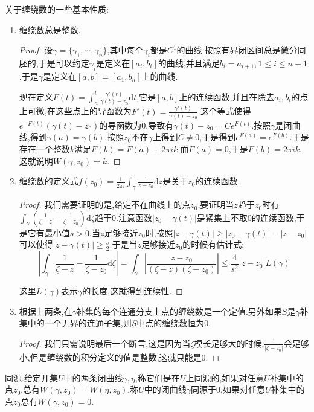 关于缠绕数的一些基本性质:
\begin{enumerate}
	\item 缠绕数总是整数.
	\begin{proof}
		
		设$\gamma=\{\gamma_1,\cdots,\gamma_n\}$,其中每个$\gamma_i$都是$C^1$的曲线.按照有界闭区间总是微分同胚的,于是可以约定$\gamma_i$是定义在$[a_i,b_i]$的曲线,并且满足$b_i=a_{i+1},1\le i\le n-1$.于是$\gamma$是定义在$[a,b]=[a_1,b_n]$上的曲线.
		
		现在定义$F(t)=\int_a^t\frac{\gamma'(t)}{\gamma(t)-z_0}\mathrm{d}t$,它是$[a,b]$上的连续函数,并且在除去$a_i,b_i$的点上可微,在这些点上的导函数为$F'(t)=\frac{\gamma'(t)}{\gamma(t)-z_0}$.这个等式使得$e^{-F(t)}(\gamma(t)-z_0)$的导函数为0,导致有$\gamma(t)-z_0=Ce^{F(t)}$.按照$\gamma$是闭曲线,得到$\gamma(a)=\gamma(b)$.按照$z_0$不在$\gamma$上得到$C\not=0$,于是得到$e^{F(a)}=e^{F(b)}$.于是存在一个整数$k$满足$F(b)=F(a)+2\pi ik$.而$F(a)=0$,于是$F(b)=2\pi ik$.这就说明$W(\gamma,z_0)=k$.
	\end{proof}
	\item 缠绕数的定义式$f(z_0)=\frac{1}{2\pi i}\int_{\gamma}\frac{1}{z-z_0}\mathrm{d}z$是关于$z_0$的连续函数.
	\begin{proof}
		
		我们需要证明的是,给定不在曲线上的点$z_0$,要证明当$z$趋于$z_0$时有$\int_{\gamma}\left(\frac{1}{\zeta-z}-\frac{1}{\zeta-z_0}\right)\mathrm{d}\zeta$趋于0.注意函数$|z_0-\gamma(t)|$是紧集上不取0的连续函数,于是它有最小值$s>0$.当$z$足够接近$z_0$时,按照$|z-\gamma(t)|\ge|z_0-\gamma(t)|-|z-z_0|$可以使得$|z-\gamma(t)|\ge\frac{s}{2}$.于是当$z$足够接近$z_0$的时候有估计式:
		$$\left|\int_{\gamma}\frac{1}{\zeta-z}-\frac{1}{\zeta-z_0}\mathrm{d}\zeta\right|=\int_{\gamma}\left|\frac{z-z_0}{(\zeta-z)(\zeta-z_0)}\right|\le\frac{4}{s^2}|z-z_0|L(\gamma)$$
		
		这里$L(\gamma)$表示$\gamma$的长度,这就得到连续性.
	\end{proof}
	\item 根据上两条,在$\gamma$补集的每个连通分支上点的缠绕数是一个定值.另外如果$S$是$\gamma$补集中的一个无界的连通子集,则$S$中点的缠绕数恒为0.
	\begin{proof}
		
		我们只需说明最后一个断言,这是因为当$\zeta$模长足够大的时候,$\frac{1}{|\zeta-z_0|}$会足够小,但是缠绕数的积分定义的值是整数,这就只能是0.
	\end{proof}
\end{enumerate}

同源.给定开集$U$中的两条闭曲线$\gamma,\eta$,称它们是在$U$上同源的,如果对任意$U$补集中的点$z_0$,总有$W(\gamma,z_0)=W(\eta,z_0)$.称$U$中的闭曲线$\gamma$同源于0,如果对任意$U$补集中的点$z_0$总有$W(\gamma,z_0)=0$.

